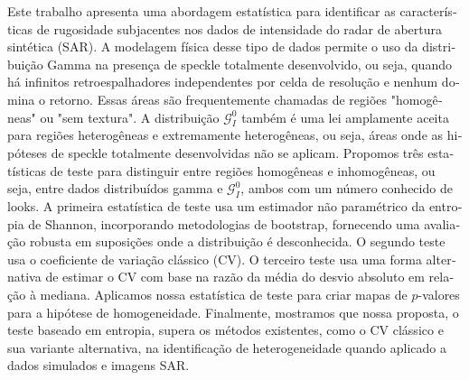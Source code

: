 \begin{otherlanguage}{portuguese} 


\begin{resumo}
{}

Este trabalho apresenta uma abordagem estatística para identificar as características de rugosidade subjacentes nos dados de intensidade do radar de abertura sintética (SAR). 
A modelagem física desse tipo de dados permite o uso da distribuição Gamma na presença de speckle totalmente desenvolvido, ou seja, quando há infinitos retroespalhadores independentes por celda de resolução e nenhum domina o retorno.
Essas áreas são frequentemente chamadas de regiões "homogêneas" ou "sem textura". 
A distribuição $\mathcal{G}_I^0$ também é uma lei amplamente aceita para regiões heterogêneas e extremamente heterogêneas, ou seja, áreas onde as hipóteses de speckle totalmente desenvolvidas não se aplicam. 
Propomos três estatísticas de teste para distinguir entre regiões homogêneas e inhomogêneas, ou seja, entre dados distribuídos gamma e $\mathcal{G}_I^0$, ambos com um número conhecido de looks. 
A primeira estatística de teste usa um estimador não paramétrico da entropia de Shannon, incorporando metodologias de bootstrap, fornecendo uma avaliação robusta em suposições onde a distribuição é desconhecida.
O segundo teste usa o coeficiente de variação clássico (CV). 
O terceiro teste usa uma forma alternativa de estimar o CV com base na razão da média do desvio absoluto em relação à mediana.
 Aplicamos nossa estatística de teste para criar mapas de $p$-valores para a hipótese de homogeneidade. 
Finalmente, mostramos que nossa proposta, o teste baseado em entropia, supera os métodos existentes, como o CV clássico e sua variante alternativa, na identificação de heterogeneidade quando aplicado a dados simulados e imagens SAR.


\end{resumo}
\end{otherlanguage}
